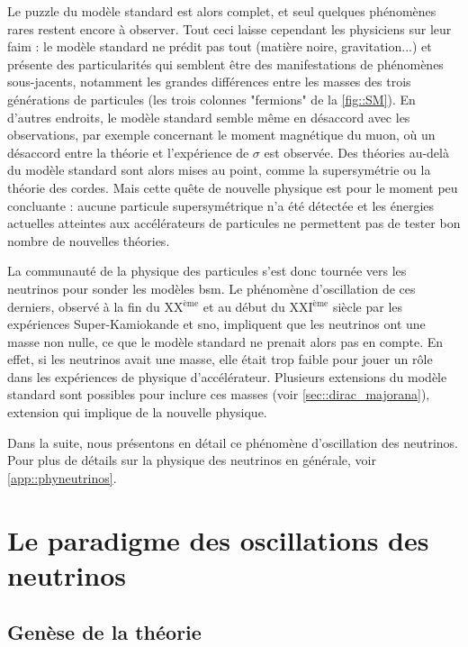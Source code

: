       Le puzzle du modèle standard est alors complet, et seul quelques phénomènes rares restent encore à observer. Tout ceci laisse cependant les physiciens sur leur faim : le modèle standard ne prédit pas tout (matière noire, gravitation...) et présente des particularités qui semblent être des manifestations de phénomènes sous-jacents, notamment les grandes différences entre les masses des trois générations de particules (les trois colonnes "fermions" de la \autoref{fig::SM}). En d'autres endroits, le modèle standard semble même en désaccord avec les observations, par exemple concernant le moment magnétique du muon, où un désaccord entre la théorie et l'expérience de $\sigma$ est observée\cite{pdg2018}. Des théories au-delà du modèle standard sont alors mises au point, comme la supersymétrie ou la théorie des cordes\cite{pdg2018}. Mais cette quête de nouvelle physique est pour le moment peu concluante : aucune particule supersymétrique n'a été détectée et les énergies actuelles atteintes aux accélérateurs de particules ne permettent pas de tester bon nombre de nouvelles théories.

      La communauté de la physique des particules s'est donc tournée vers les neutrinos pour sonder les modèles \gls{bsm}. Le phénomène d'oscillation de ces derniers, observé à la fin du XX$^{\text{ème}}$ et au début du XXI$^{\text{ème}}$ siècle par les expériences Super-Kamiokande\cite{Fukuda1998} et \gls{sno}\cite{Aharmim2013}, impliquent que les neutrinos ont une masse non nulle, ce que le modèle standard ne prenait alors pas en compte. En effet, si les neutrinos avait une masse, elle était trop faible pour jouer un rôle dans les expériences de physique d'accélérateur.  Plusieurs extensions du modèle standard sont possibles pour inclure ces masses (voir \autoref{sec::dirac_majorana}), extension qui implique de la nouvelle physique.

      Dans la suite, nous présentons en détail ce phénomène d'oscillation des neutrinos. Pour plus de détails sur la physique des neutrinos en générale, voir \autoref{app::phyneutrinos}.

  \section{Le paradigme des oscillations des neutrinos}

    \subsection{Genèse de la théorie}

